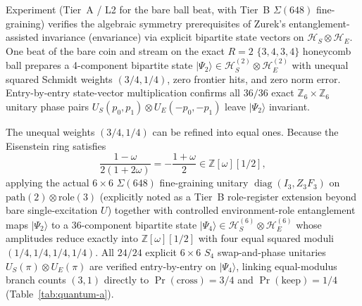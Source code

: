 Experiment  (Tier~A / L2 for the bare ball beat, with Tier~B $\Sigma(648)$ fine-graining)
verifies the algebraic symmetry prerequisites of Zurek's entanglement-assisted invariance (envariance) \cite{zurek2005}
via explicit bipartite state vectors on $\mathcal{H}_S \otimes \mathcal{H}_E$. One beat of the bare coin and stream on
the exact $R = 2$ $\{3,4,3,4\}$ honeycomb ball prepares a 4-component bipartite state
$|\Psi_2\rangle \in \mathcal{H}_S^{(2)} \otimes \mathcal{H}_E^{(2)}$ with unequal squared Schmidt weights $(3/4, 1/4)$,
zero frontier hits, and zero norm error. Entry-by-entry state-vector multiplication confirms all $36/36$ exact
$\mathbb{Z}_6 \times \mathbb{Z}_6$ unitary phase pairs $U_S(p_0, p_1) \otimes U_E(-p_0, -p_1)$ leave $|\Psi_2\rangle$
invariant.

The unequal weights $(3/4, 1/4)$ can be refined into equal ones. Because the Eisenstein ring satisfies
\begin{equation}
\frac{1 - \omega}{2(1 + 2\omega)} = -\frac{1 + \omega}{2} \in \mathbb{Z}[\omega][1/2],
\label{eq:envariance-split}
\end{equation}
applying the actual $6 \times 6$ $\Sigma(648)$ fine-graining unitary $\operatorname{diag}(I_3, Z_3 F_3)$ on
$\mathrm{path}(2) \otimes \mathrm{role}(3)$ (explicitly noted as a Tier~B role-register extension beyond bare
single-excitation $U$) together with controlled environment-role entanglement maps $|\Psi_2\rangle$ to a 36-component
bipartite state $|\Psi_4\rangle \in \mathcal{H}_S^{(6)} \otimes \mathcal{H}_E^{(6)}$ whose amplitudes reduce exactly
into $\mathbb{Z}[\omega][1/2]$ with four equal squared moduli $(1/4, 1/4, 1/4, 1/4)$. All $24/24$ explicit $6 \times 6$
$S_4$ swap-and-phase unitaries $U_S(\pi) \otimes U_E(\pi)$ are verified entry-by-entry on $|\Psi_4\rangle$, linking
equal-modulus branch counts $(3, 1)$ directly to $\Pr(\text{cross}) = 3/4$ and $\Pr(\text{keep}) = 1/4$
(Table~\ref{tab:quantum-a}).

